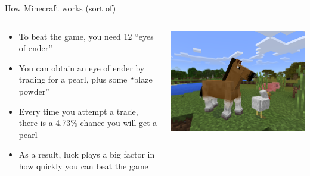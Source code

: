 \documentclass{beamer}\usepackage[]{graphicx}\usepackage[]{color}
\begin{document}
\begin{darkframes}
    \begin{frame}{How Minecraft works (sort of)}
      \begin{columns}
        \begin{column}{0.5\textwidth}
          \begin{itemize}[<+->]
            \item To beat the game, you need 12 ``eyes of ender''
            \item You can obtain an eye of ender by trading for a pearl, plus some ``blaze powder''
            \item Every time you attempt a trade, there is a 4.73\% chance you will get a pearl
            \item As a result, luck plays a big factor in how quickly you can beat the game
          \end{itemize}
        \end{column}
        \begin{column}{0.5\textwidth}
          \includegraphics[width=\textwidth]{minecraft}
        \end{column}
      \end{columns}
    \end{frame}


\end{darkframes}
\end{document}
